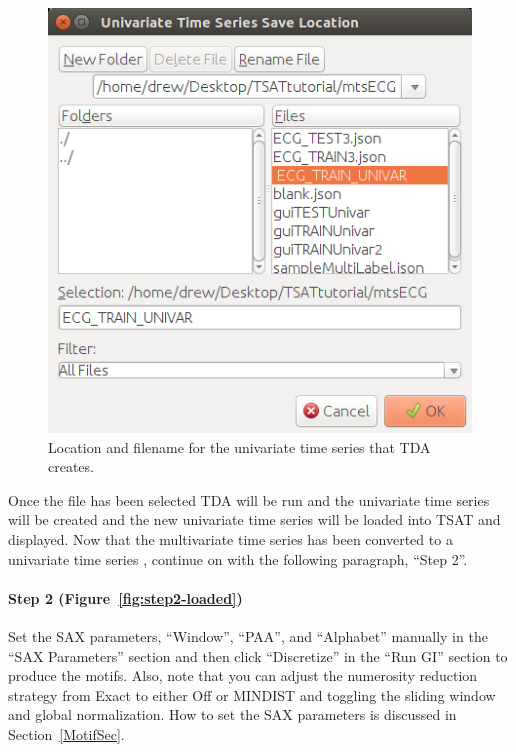\documentclass[titlepage, letterpaper, 12pt]{article}
\begin{document}
\begin{figure}
	\centering
	\includegraphics[width=\textwidth]{pictures/univarTSSaveLoc}
	\caption{Location and filename for the univariate time series that TDA creates.}
	\label{fig:univartssavelocMotif}
\end{figure}


Once the file has been selected TDA will be run and the univariate time series will be created and the new univariate time series will be loaded into TSAT and displayed.  Now that the multivariate time series has been converted to a univariate time series , continue on with the following paragraph, ``Step 2''.


\paragraph{Step 2 (Figure~\ref{fig:step2-loaded})} Set the SAX parameters, ``Window'', ``PAA'', and ``Alphabet'' manually in the ``SAX Parameters'' section and then click ``Discretize'' in the ``Run GI'' section to produce the motifs.  Also, note that you can adjust the numerosity reduction strategy from Exact to either Off or MINDIST and toggling the sliding window and global normalization. How to set the SAX parameters is discussed in Section~\ref{MotifSec}.
\end{document}
